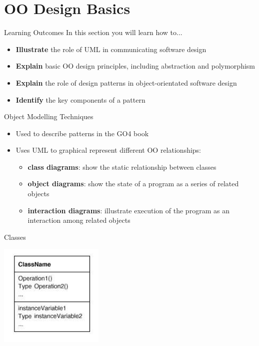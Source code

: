 \part{OO Design Basics}
\frame{\partpage}

\begin{frame}{Learning Outcomes}
	In this section you will learn how to...
	
	\begin{itemize}
		\item \textbf{Illustrate} the role of UML in communicating software design
		\item \textbf{Explain} basic OO design principles, including abstraction and polymorphism
		\item \textbf{Explain} the role of design patterns in object-orientated software design
		\item \textbf{Identify} the key components of a pattern
	\end{itemize}
\end{frame}

\begin{frame}{Object Modelling Techniques}
	\begin{itemize}
		\item Used to describe patterns in the GO4 book
		\item Uses UML to graphical represent different OO relationships:
		\begin{itemize}
			\item \textbf{class diagrams}: show the static relationship between classes
			\item \textbf{object diagrams}: show the state of a program as a series of related objects
			\item \textbf{interaction diagrams}: illustrate execution of the program as an interaction among
			related objects
		\end{itemize}
	\end{itemize}
\end{frame}

\begin{frame}{Classes}
	\begin{center}
		\includegraphics[width=5cm]{class_diagram.jpg}
	\end{center}
\end{frame}

